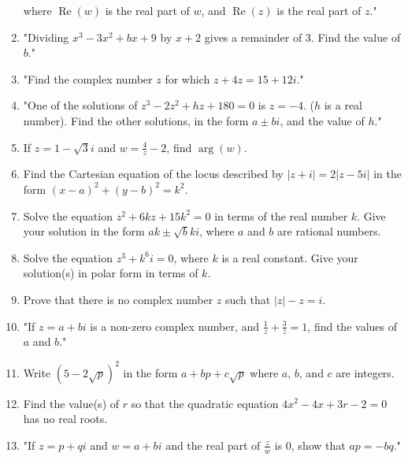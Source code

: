 \documentclass{article}
\begin{document}
\begin{enumerate}
where \(\operatorname{Re}(w)\) is the real part of \( w \), and \(\operatorname{Re}(z)\) is the real part of \( z\)."
\vspace{3cm}
\item "Dividing \( x^3 - 3x^2 + bx + 9 \) by \( x + 2 \) gives a remainder of 3. Find the value of \( b \)."
\vspace{3cm}
\item "Find the complex number \( z \) for which \( z + 4z = 15 + 12i \)."
\vspace{3cm}
\item "One of the solutions of \( z^3 - 2z^2 + hz + 180 = 0 \) is \( z = -4 \). (\( h \) is a real number). Find the other solutions, in the form \( a \pm bi \), and the value of \( h \)."
\vspace{3cm}
\item If \( z = 1 - \sqrt{3}i \) and \( w = \frac{4}{z} - 2 \), find \(\arg(w)\).
\vspace{3cm}
\item Find the Cartesian equation of the locus described by \( |z + i| = 2|z - 5i| \) in the form \((x-a)^2 + (y-b)^2 = k^2\).
\vspace{3cm}
\item Solve the equation \( z^2 + 6kz + 15k^2 = 0 \) in terms of the real number \( k \). Give your solution in the form \( ak \pm \sqrt{b}ki \), where \( a \) and \( b \) are rational numbers.
\vspace{3cm}
\item Solve the equation \( z^3 + k^6i = 0 \), where \( k \) is a real constant. Give your solution(s) in polar form in terms of \( k \).
\vspace{3cm}
\item Prove that there is no complex number \( z \) such that \( |z| - z = i \).
\vspace{3cm}
\item "If \( z = a + bi \) is a non-zero complex number, and \( \frac{1}{z} + \frac{3}{\overline{z}} = 1 \), find the values of \( a \) and \( b \)."
\vspace{3cm}
\item Write \((5 - 2\sqrt{p})^2\) in the form \(a + bp + c\sqrt{p}\) where \(a\), \(b\), and \(c\) are integers.
\vspace{3cm}
\item Find the value(s) of \( r \) so that the quadratic equation \( 4x^2 - 4x + 3r - 2 = 0 \) has no real roots.
\vspace{3cm}
\item "If \( z = p + qi \) and \( w = a + bi \) and the real part of \( \frac{z}{w} \) is 0, show that \( ap = -bq \)."

\end{enumerate}
\end{document}
